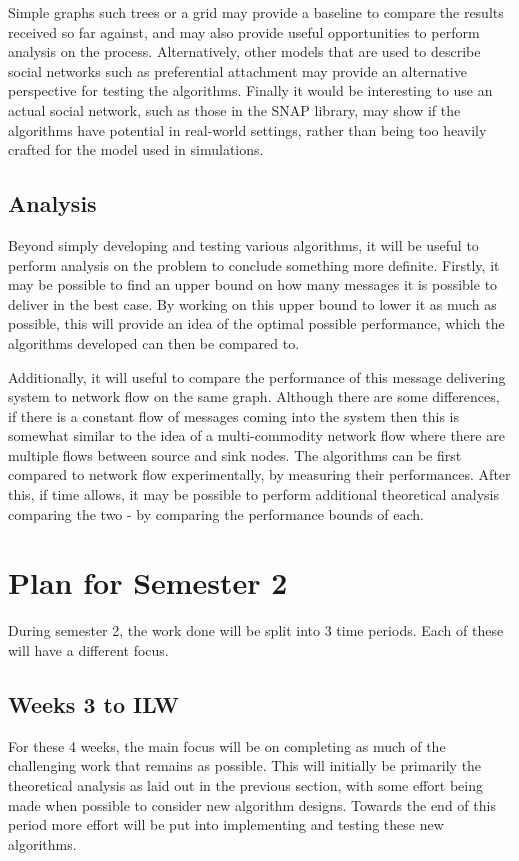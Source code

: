 \documentclass[bsc,frontabs,twoside,singlespacing,parskip,deptreport]{infthesis}     %
\begin{document}
Simple graphs such trees or a grid may provide a baseline to compare the results received so far against, and may also provide useful opportunities to perform analysis on the process. Alternatively, other models that are used to describe social networks such as preferential attachment may provide an alternative perspective for testing the algorithms. Finally it would be interesting to use an actual social network, such as those in the SNAP library\cite{snapnets}, may show if the algorithms have potential in real-world settings, rather than being too heavily crafted for the model used in simulations.

\subsection{Analysis}
Beyond simply developing and testing various algorithms, it will be useful to perform analysis on the problem to conclude something more definite. Firstly, it may be possible to find an upper bound on how many messages it is possible to deliver in the best case. By working on this upper bound to lower it as much as possible, this will provide an idea of the optimal possible performance, which the algorithms developed can then be compared to.

Additionally, it will useful to compare the performance of this message delivering system to network flow on the same graph. Although there are some differences, if there is a constant flow of messages coming into the system then this is somewhat similar to the idea of a multi-commodity network flow where there are multiple flows between source and sink nodes. The algorithms can be first compared to network flow experimentally, by measuring their performances. After this, if time allows, it may be possible to perform additional theoretical analysis comparing the two - by comparing the performance bounds of each.


\section{Plan for Semester 2}
During semester 2, the work done will be split into 3 time periods. Each of these will have a different focus.
\subsection{Weeks 3 to ILW}
For these 4 weeks, the main focus will be on completing as much of the challenging work that remains as possible. This will initially be primarily the theoretical analysis as laid out in the previous section, with some effort being made when possible to consider new algorithm designs. Towards the end of this period more effort will be put into implementing and testing these new algorithms.
\end{document}
